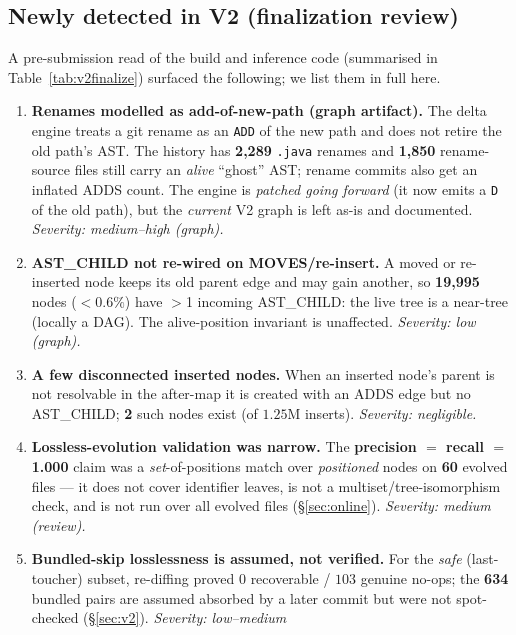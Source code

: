 \documentclass[11pt,a4paper]{article}
\newcommand{\code}[1]{\texttt{#1}}
\newcommand{\edge}[1]{\textsc{#1}}
\begin{document}
	\subsection{Newly detected in V2 (finalization review)}\label{sec:newissues}
	A pre-submission read of the build and inference code (summarised in
	Table~\ref{tab:v2finalize}) surfaced the following; we list them in full here.

	\begin{enumerate}[nosep,label=\textbf{N\arabic*.}]
		\item \textbf{Renames modelled as add-of-new-path (graph artifact).} The delta
		engine treats a git rename as an \code{ADD} of the new path and does not retire
		the old path's AST. The history has \textbf{2{,}289} \texttt{.java} renames and
		\textbf{1{,}850} rename-source files still carry an \emph{alive} ``ghost'' AST;
		rename commits also get an inflated \edge{ADDS} count. The engine is
		\emph{patched going forward} (it now emits a \code{D} of the old path), but the
		\emph{current} V2 graph is left as-is and documented. \emph{Severity:
		medium--high (graph).}
		\item \textbf{\edge{AST\_CHILD} not re-wired on \edge{MOVES}/re-insert.} A
		moved or re-inserted node keeps its old parent edge and may gain another, so
		\textbf{19{,}995} nodes ($<0.6\%$) have $>$1 incoming \edge{AST\_CHILD}: the live
		tree is a near-tree (locally a DAG). The alive-position invariant is unaffected.
		\emph{Severity: low (graph).}
		\item \textbf{A few disconnected inserted nodes.} When an inserted node's parent
		is not resolvable in the after-map it is created with an \edge{ADDS} edge but no
		\edge{AST\_CHILD}; \textbf{2} such nodes exist (of $1.25$M inserts). \emph{Severity:
		negligible.}
		\item \textbf{Lossless-evolution validation was narrow.} The
		\textbf{precision $=$ recall $=$ 1.000} claim was a \emph{set}-of-positions match
		over \emph{positioned} nodes on \textbf{60} evolved files --- it does not cover
		identifier leaves, is not a multiset/tree-isomorphism check, and is not run over
		all evolved files (\S\ref{sec:online}). \emph{Severity: medium (review).}
		\item \textbf{Bundled-skip losslessness is assumed, not verified.} For the
		\emph{safe} (last-toucher) subset, re-diffing proved $0$ recoverable / $103$
		genuine no-ops; the \textbf{634} bundled pairs are assumed absorbed by a later
		commit but were not spot-checked (\S\ref{sec:v2}). \emph{Severity: low--medium
}
\end{enumerate}
\end{document}
